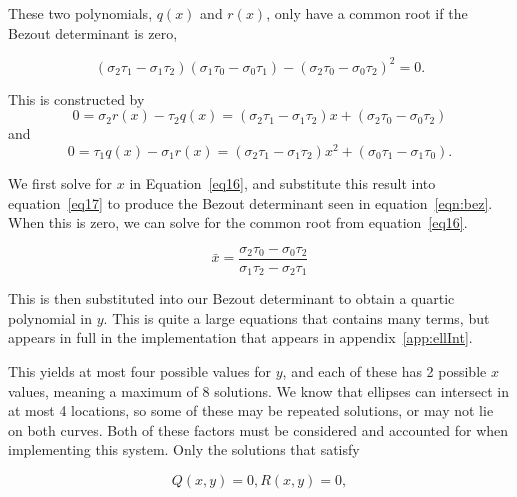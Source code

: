 \documentclass[12pt,openany,a4paper]{book}
\begin{document}
\bigskip

These two polynomials, $q(x)$ and $r(x)$, only have a common root if the Bezout determinant is zero\cite{intell3},

\begin{equation}
\label{eqn:bez}
(\sigma_2\tau_1 - \sigma_1\tau_2)(\sigma_1\tau_0 - \sigma_0\tau_1) - (\sigma_2\tau_0 - \sigma_0\tau_2)^2 = 0.
\end{equation}

\bigskip

This is constructed by
\begin{equation}
\label{eq16}
0 = \sigma_2r(x) - \tau_2q(x) = (\sigma_2\tau_1 - \sigma_1\tau_2)x + (\sigma_2\tau_0 - \sigma_0\tau_2)
\end{equation}
and
\begin{equation}
\label{eq17}
0 = \tau_1 q(x) - \sigma_1r(x) = (\sigma_2\tau_1 - \sigma_1\tau_2)x^2 + (\sigma_0\tau_1 - \sigma_1\tau_0).
\end{equation}

\bigskip

We first solve for $x$ in Equation~\ref{eq16}, and substitute this result into equation~\ref{eq17} to produce the Bezout determinant seen in equation~\ref{eqn:bez}. When this is zero, we can solve for the common root from equation~\ref{eq16}.

\begin{equation}
\bar{x} = \frac{\sigma_2\tau_0 - \sigma_0\tau_2}{\sigma_1\tau_2 - \sigma_2\tau_1}
\end{equation}

\bigskip

This is then substituted into our Bezout determinant to obtain a quartic polynomial in $y$. This is quite a large equations that contains many terms, but appears in full in the implementation that appears in appendix~\ref{app:ellInt}.

\bigskip

This yields at most four possible values for $y$, and each of these has 2 possible $x$ values, meaning a maximum of 8 solutions. We know that ellipses can intersect in at most 4 locations, so some of these may be repeated solutions, or may not lie on both curves. Both of these factors must be considered and accounted for when implementing this system. Only the solutions that satisfy

\begin{equation}
Q(x,y)=0, R(x,y)=0,
\end{equation}
\end{document}
